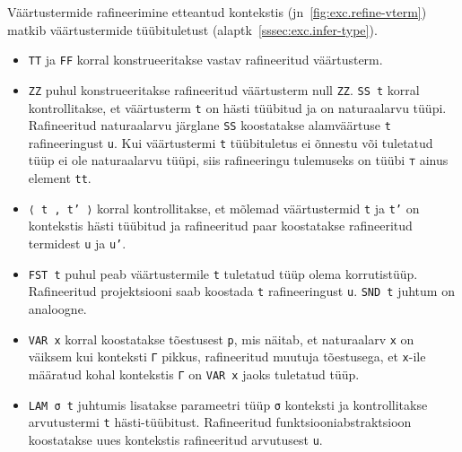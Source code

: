\documentclass[a4paper,12pt]{article}
\begin{document}
Väärtustermide rafineerimine etteantud kontekstis (jn~\ref{fig:exc.refine-vterm}) matkib väärtustermide tüübituletust (alaptk~\ref{sssec:exc.infer-type}).
\begin{itemize}
\item {\tt TT} ja {\tt FF} korral konstrueeritakse vastav rafineeritud väärtusterm.
\item {\tt ZZ} puhul konstrueeritakse rafineeritud väärtusterm null {\tt ZZ}. {\tt SS t} korral kontrollitakse, et väärtusterm {\tt t} on hästi tüübitud ja on naturaalarvu tüüpi. Rafineeritud naturaalarvu järglane {\tt SS} koostatakse alamväärtuse {\tt t} rafineeringust {\tt u}. Kui väärtustermi {\tt t} tüübituletus ei õnnestu või tuletatud tüüp ei ole naturaalarvu tüüpi, siis rafineeringu tulemuseks on tüübi {\tt ⊤} ainus element {\tt tt}.
\item {\tt ⟨ t , t' ⟩} korral kontrollitakse, et mõlemad väärtustermid {\tt t} ja {\tt t'} on kontekstis hästi tüübitud ja rafineeritud paar koostatakse rafineeritud termidest {\tt u} ja {\tt u'}.
\item {\tt FST t} puhul peab väärtustermile {\tt t} tuletatud tüüp olema korrutistüüp. Rafineeritud projektsiooni saab koostada {\tt t} rafineeringust {\tt u}. {\tt SND t} juhtum on analoogne.
\item {\tt VAR x} korral koostatakse tõestusest {\tt p}, mis näitab, et naturaalarv {\tt x} on väiksem kui konteksti {\tt Γ} pikkus, rafineeritud muutuja tõestusega, et {\tt x}-ile määratud kohal kontekstis {\tt Γ} on {\tt VAR x} jaoks tuletatud tüüp.
\item {\tt LAM σ t} juhtumis lisatakse parameetri tüüp {\tt σ} konteksti ja kontrollitakse arvutustermi {\tt t} hästi-tüübitust. Rafineeritud funktsiooniabstraktsioon koostatakse uues kontekstis rafineeritud arvutusest {\tt u}.
\end{itemize}
\end{document}

